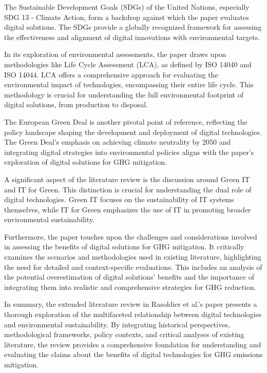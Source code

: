 \documentclass[conference,compsoc]{IEEEtran}
\begin{document}
The Sustainable Development Goals (SDGs) of the United Nations, especially SDG 13 - Climate Action, form a backdrop against which the paper evaluates digital solutions. The SDGs provide a globally recognized framework for assessing the effectiveness and alignment of digital innovations with environmental targets.

In its exploration of environmental assessments, the paper draws upon methodologies like Life Cycle Assessment (LCA), as defined by ISO 14040 and ISO 14044. LCA offers a comprehensive approach for evaluating the environmental impact of technologies, encompassing their entire life cycle. This methodology is crucial for understanding the full environmental footprint of digital solutions, from production to disposal.

The European Green Deal is another pivotal point of reference, reflecting the policy landscape shaping the development and deployment of digital technologies. The Green Deal's emphasis on achieving climate neutrality by 2050 and integrating digital strategies into environmental policies aligns with the paper's exploration of digital solutions for GHG mitigation.

A significant aspect of the literature review is the discussion around Green IT and IT for Green. This distinction is crucial for understanding the dual role of digital technologies. Green IT focuses on the sustainability of IT systems themselves, while IT for Green emphasizes the use of IT in promoting broader environmental sustainability.

Furthermore, the paper touches upon the challenges and considerations involved in assessing the benefits of digital solutions for GHG mitigation. It critically examines the scenarios and methodologies used in existing literature, highlighting the need for detailed and context-specific evaluations. This includes an analysis of the potential overestimation of digital solutions' benefits and the importance of integrating them into realistic and comprehensive strategies for GHG reduction.

In summary, the extended literature review in Rasoldier et al.'s paper presents a thorough exploration of the multifaceted relationship between digital technologies and environmental sustainability. By integrating historical perspectives, methodological frameworks, policy contexts, and critical analyses of existing literature, the review provides a comprehensive foundation for understanding and evaluating the claims about the benefits of digital technologies for GHG emissions mitigation.
\end{document}
